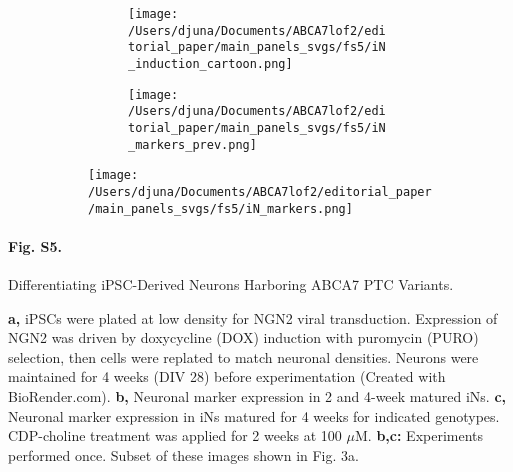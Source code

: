 % 
% 
\begin{figure}[H]
    \begin{subfigure}[t]{\textwidth}
        \begin{subfigure}[t]{0.45\textwidth}
            \caption{}
            \texttt{[image: /Users/djuna/Documents/ABCA7lof2/editorial\_paper/main\_panels\_svgs/fs5/iN\_induction\_cartoon.png]}        
        \end{subfigure}
        \begin{subfigure}[t]{0.45\textwidth}
            \caption{}
            \texttt{[image: /Users/djuna/Documents/ABCA7lof2/editorial\_paper/main\_panels\_svgs/fs5/iN\_markers\_prev.png]}        
        \end{subfigure}
    \end{subfigure}
    \begin{subfigure}[t]{0.8\textwidth}
        \caption{}
        \hspace{2cm}
        \texttt{[image: /Users/djuna/Documents/ABCA7lof2/editorial\_paper/main\_panels\_svgs/fs5/iN\_markers.png]}        
    \end{subfigure}
\end{figure}
\paragraph*{Fig. S5.} Differentiating iPSC-Derived Neurons Harboring ABCA7 PTC Variants.
{}
\textbf{a,} iPSCs were plated at low density for NGN2 viral transduction. Expression of NGN2 was driven by doxycycline (DOX) induction with puromycin (PURO) selection, then cells were replated to match neuronal densities. Neurons were maintained for 4 weeks (DIV 28) before experimentation (Created with BioRender.com). 
\textbf{b,} Neuronal marker expression in 2 and 4-week matured iNs. 
\textbf{c,} Neuronal marker expression in iNs matured for 4 weeks for indicated genotypes. CDP-choline treatment was applied for 2 weeks at 100 $\mu$M. \textbf{b,c:} Experiments performed once. Subset of these images shown in Fig. 3a.
%

